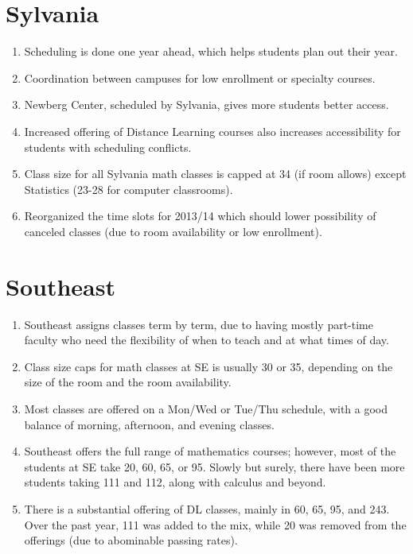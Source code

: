 \section{Sylvania}
\begin{enumerate}
    \item  Scheduling is done one year ahead, which helps students plan out
      their year.
    \item  Coordination between campuses for low enrollment or specialty
      courses.
    \item  Newberg Center, scheduled by Sylvania, gives more students better
      access.
    \item  Increased offering of Distance Learning courses also increases
      accessibility for students with scheduling conflicts.
	\item  Class size for all Sylvania math classes is capped at 34 (if room allows) except
    Statistics (23-28 for computer classrooms).
	\item  Reorganized the time slots for 2013/14 which should lower possibility of canceled classes (due 
	to room availability or low enrollment).
\end{enumerate}

\section{Southeast}
\begin{enumerate}
  \item Southeast assigns classes term by term, due to having mostly part-time
    faculty who need the flexibility of when to teach and at what times of day.
  \item Class size caps for math classes at SE is usually 30 or 35, depending
    on the size of the room and the room availability.  
  \item Most classes are offered on a Mon/Wed or Tue/Thu schedule, with a good
    balance of morning, afternoon, and evening classes.
  \item Southeast offers the full range of mathematics courses; however, most
    of the students at SE take 20, 60, 65, or 95.  Slowly but surely, there
    have been more students taking 111 and 112, along with calculus and beyond.
  \item There is a substantial offering of DL classes, mainly in 60, 65, 95,
    and 243.  Over the past year, 111 was added to the mix, while 20 was
    removed from the offerings (due to abominable passing rates).
\end{enumerate}

